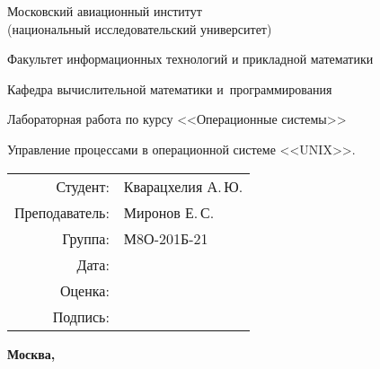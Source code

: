 \begin{titlepage}
	\begin{center}
		\bfseries
		
		{\Large Московский авиационный институт\\ (национальный исследовательский университет)}
		
		\vspace{48pt}
		
		{\large Факультет информационных технологий и прикладной математики}
		
		\vspace{36pt}
		
		{\large Кафедра вычислительной математики и~программирования}
		
		\vspace{48pt}
		
		Лабораторная работа  по курсу <<Операционные системы>>
		
		\vspace{48pt}
		
		Управление процессами в операционной системе <<UNIX>>.
		
	\end{center}
	
	\vspace{150pt}
	
	\begin{flushright}
		\begin{tabular}{rl}
			Студент: & Кварацхелия А.\,Ю. \\
			Преподаватель: & Миронов Е.\,С. \\
			Группа: & М8О-201Б-21 \\
			Дата: & \\
			Оценка: & \\
			Подпись: & \\
		\end{tabular}
	\end{flushright}
	
	\vfill
	
	\begin{center}
		\bfseries
		Москва, \the\year
	\end{center}
\end{titlepage}
